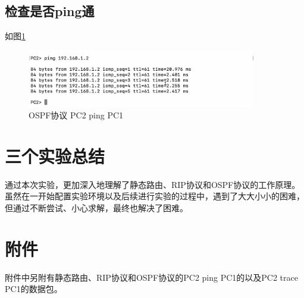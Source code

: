 \documentclass[a4paper,12pt]{report}
\begin{document}
\begin{spacing}{1.5}
\subsection{检查是否ping通}
如图\ref{33}
\begin{figure}[htb!]
  \centering
\includegraphics[width=10cm]{figure/ospf ping.png}
\caption{ OSPF协议 PC2 ping PC1}
\label{33}
\end{figure}

\section{三个实验总结}
通过本次实验，更加深入地理解了静态路由、RIP协议和OSPF协议的工作原理。虽然在一开始配置实验环境以及后续进行实验的过程中，遇到了大大小小的困难，但通过不断尝试、小心求解，最终也解决了困难。

\section{附件}
附件中另附有静态路由、RIP协议和OSPF协议的PC2 ping PC1的以及PC2 trace PC1的数据包。
\end{spacing}
\end{document}
